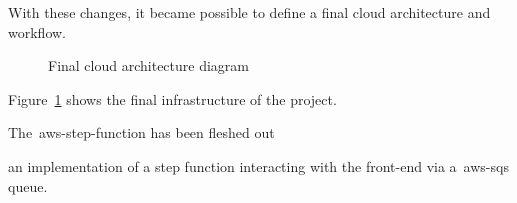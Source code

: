With these changes, it became possible to define a final cloud architecture and workflow.

\begin{figure}[!htb]
    \minipage{\textwidth}
    
    \caption{Final cloud architecture diagram}\label{fig:final_design}
    \endminipage\hfill
\end{figure}

Figure~\ref{fig:final_design} shows the final infrastructure of the project.

The~\gls{aws-step-function} has been fleshed out

an implementation of a step function
interacting with the front-end via a~\gls{aws-sqs} queue.
